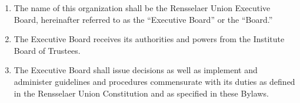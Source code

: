 

\begin{enumerate}
\item The name of this organization shall be the Rensselaer Union Executive Board, hereinafter referred to as the ``Executive Board'' or the ``Board.''
\item The Executive Board receives its authorities and powers from the Institute Board of Trustees.
\item The Executive Board shall issue decisions as well as implement and administer guidelines and procedures commensurate with its duties as defined in the Rensselaer Union Constitution and as specified in these Bylaws.
\end{enumerate}


